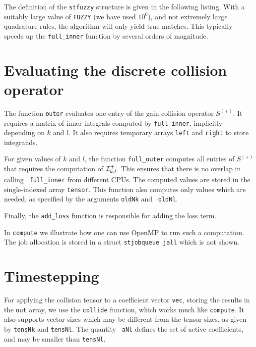 The definition of the {\tt stfuzzy} structure is given in the following listing. With a suitably large value
of {\tt FUZZY} (we have used $10^6$), and not extremely large quadrature rules, the algorithm will only yield
true matches. This typically speeds up the {\tt full\_inner} function by several orders of magnitude.



\section{Evaluating the discrete collision operator}

The function {\tt outer} evaluates one entry of the gain collision operator $S^{(+)}$. It requires a matrix of
inner integrals computed by {\tt full\_inner}, implicitly depending on $k$ and $l$. It also requires temporary
arrays {\tt left} and {\tt right} to store integrands.



For given values of $k$ and $l$, the function {\tt full\_outer} computes all entries of $S^{(+)}$ that
requires the computation of $\mathcal{I}^{+}_{k,l}$. This ensures that there is no overlap in calling {\tt
full\_inner} from different CPUs. The computed values are stored in the single-indexed array {\tt tensor}.
This function also computes only values which are needed, as specified by the arguments {\tt oldNk} and {\tt
oldNl}.



Finally, the {\tt add\_loss} function is responsible for adding the loss term.



In {\tt compute} we illustrate how one can use OpenMP to run such a computation. The job allocation is stored
in a struct {\tt stjobqueue jall} which is not shown.



\section{Timestepping}

For applying the collision tensor to a coefficient vector {\tt vec}, storing the results in the {\tt out}
array, we use the {\tt collide} function, which works much like {\tt compute}. It also supports vector sizes
which may be different from the tensor sizes, as given by {\tt tensNk} and {\tt tensNl}. The quantity {\tt
aNl} defines the set of active coefficients, and may be smaller than {\tt tensNl}.

